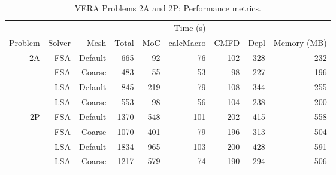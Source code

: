 {{{{        %
        \begin{table}[htbp]
          \caption{VERA Problems 2A and 2P: Performance metrics.\label{tab:LSMOC:LatticeDepletion:Performance}}
          \begin{tabular}{rrrrrrrrr}\toprule
                                &        &         & \multicolumn{5}{c}{Time (s)} & \\\cline{4-8}
            Problem             & Solver & Mesh    & Total & MoC & calcMacro & CMFD & Depl & Memory (MB)\\\midrule
            \multirow{4}{*}{2A} &    FSA & Default &  665 &  92 &  76 & 102 & 328 & 232\\
                                &    FSA & Coarse  &  483 &  55 &  53 &  98 & 227 & 196\\
                                &    LSA & Default &  845 & 219 &  79 & 108 & 344 & 255\\
                                &    LSA & Coarse  &  553 &  98 &  56 & 104 & 238 & 200\\\midrule
            \multirow{4}{*}{2P} &    FSA & Default & 1370 & 548 & 101 & 202 & 415 & 558\\
                                &    FSA & Coarse  & 1070 & 401 &  79 & 196 & 313 & 504\\
                                &    LSA & Default & 1834 & 965 & 103 & 200 & 428 & 591\\
                                &    LSA & Coarse  & 1217 & 579 &  74 & 190 & 294 & 506\\\bottomrule
          \end{tabular}
        \end{table}

}}}}
